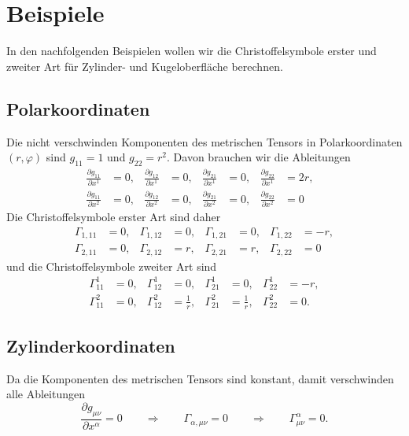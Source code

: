 \section{Beispiele}
In den nachfolgenden Beispielen wollen wir die Christoffelsymbole erster
und zweiter Art für Zylinder- und Kugeloberfläche berechnen.


\subsection{Polarkoordinaten}
Die nicht verschwinden Komponenten
des metrischen Tensors in Polarkoordinaten $(r,\varphi)$
sind $g_{11}=1$ und $g_{22}=r^2$.
Davon brauchen wir die Ableitungen
\[
\begin{aligned}
\frac{\partial g_{11}}{\partial x^1} &=0,&
\frac{\partial g_{12}}{\partial x^1} &=0,&
\frac{\partial g_{21}}{\partial x^1} &=0,&
\frac{\partial g_{22}}{\partial x^1} &=2r,&
\\
\frac{\partial g_{11}}{\partial x^2} &=0,&
\frac{\partial g_{12}}{\partial x^2} &=0,&
\frac{\partial g_{21}}{\partial x^2} &=0,&
\frac{\partial g_{22}}{\partial x^2} &=0
\end{aligned}
\]
Die Christoffelsymbole erster Art sind daher 
\[
\begin{aligned}
\Gamma_{1,11} &=  0,&
\Gamma_{1,12} &=  0,&
\Gamma_{1,21} &=  0,&
\Gamma_{1,22} &= -r,
\\
\Gamma_{2,11} &=  0,&
\Gamma_{2,12} &=  r,&
\Gamma_{2,21} &=  r,&
\Gamma_{2,22} &=  0
\end{aligned}
\]
und die Christoffelsymbole zweiter Art sind
\begin{equation}
\begin{aligned}
\Gamma_{11}^1 &= 0,&
\Gamma_{12}^1 &= 0,&
\Gamma_{21}^1 &= 0,&
\Gamma_{22}^1 &=-r,
\\
\Gamma_{11}^2 &= 0,&
\Gamma_{12}^2 &= \frac1{r},&
\Gamma_{21}^2 &= \frac1{r},&
\Gamma_{22}^2 &= 0.
\end{aligned}
\label{skript:geodaeten:christoffel:polar}
\end{equation}

\subsection{Zylinderkoordinaten}
Da die Komponenten des metrischen Tensors sind konstant, damit verschwinden
alle Ableitungen
\[
\frac{\partial g_{\mu\nu}}{\partial x^\alpha}=0
\qquad\Rightarrow\qquad
\Gamma_{\alpha,\mu\nu}=0
\qquad\Rightarrow\qquad
\Gamma_{\mu\nu}^\alpha=0.
\]

